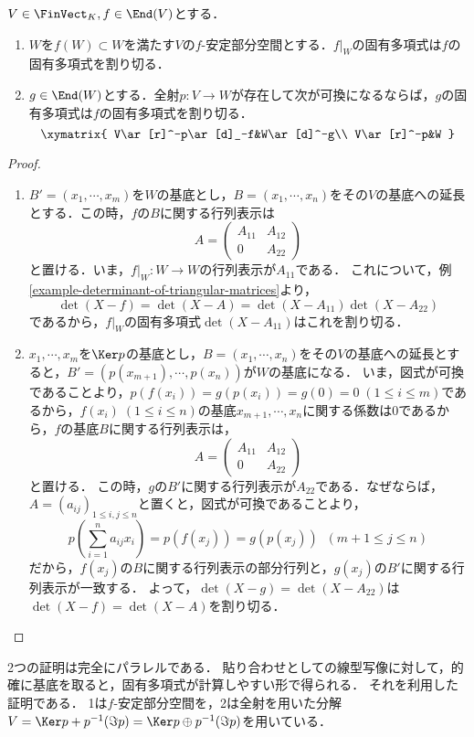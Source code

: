 \documentclass[uplatex, dvipdfmx]{jsreport}
\begin{document}
\begin{proposition}[最小公倍式としての固有多項式]\label{prop-eigenpolynomial-as-patching}
    $V\in\FinVect_K,f\in\End(V)$とする．
    \begin{enumerate}
        \item $W$を$f(W)\subset W$を満たす$V$の$f$-安定部分空間とする．$f|_W$の固有多項式は$f$の固有多項式を割り切る．
        \item $g\in\End(W)$とする．全射$p:V\to W$が存在して次が可換になるならば，$g$の固有多項式は$f$の固有多項式を割り切る．
        \[\xymatrix{
            V\ar[r]^-p\ar[d]_-f&W\ar[d]^-g\\
            V\ar[r]^-p&W
        }\]
    \end{enumerate}
\end{proposition}
\begin{proof}\mbox{}
    \begin{enumerate}
        \item $B'=(x_1,\cdots,x_m)$を$W$の基底とし，$B=(x_1,\cdots,x_n)$をその$V$の基底への延長とする．この時，$f$の$B$に関する行列表示は\[A=\begin{pmatrix}A_{11}&A_{12}\\0&A_{22}\end{pmatrix}\]と置ける．いま，$f|_W:W\to W$の行列表示が$A_{11}$である．
        これについて，例\ref{example-determinant-of-triangular-matrices}より，
        \[\det(X-f)=\det(X-A)=\det(X-A_{11})\det(X-A_{22})\]
        であるから，$f|_W$の固有多項式$\det(X-A_{11})$はこれを割り切る．
        \item $x_1,\cdots,x_m$を$\Ker p$の基底とし，$B=(x_1,\cdots,x_n)$をその$V$の基底への延長とすると，$B'=(p(x_{m+1}),\cdots,p(x_n))$が$W$の基底になる．
        いま，図式が可換であることより，$p(f(x_i))=g(p(x_i))=g(0)=0\;(1\le i\le m)$であるから，$f(x_i)\;(1\le i\le n)$の基底$x_{m+1},\cdots,x_n$に関する係数は$0$であるから，$f$の基底$B$に関する行列表示は，
        \[A=\begin{pmatrix}A_{11}&A_{12}\\0&A_{22}\end{pmatrix}\]と置ける．
        この時，$g$の$B'$に関する行列表示が$A_{22}$である．なぜならば，$A=(a_{ij})_{1\le i,j\le n}$と置くと，図式が可換であることより，
        \[p(\sum^n_{i=1}a_{ij}x_i)=p(f(x_j))=g(p(x_j))\;\;(m+1\le j\le n)\]
        だから，$f(x_j)$の$B$に関する行列表示の部分行列と，$g(x_j)$の$B'$に関する行列表示が一致する．
        よって，$\det(X-g)=\det(X-A_{22})$は$\det(X-f)=\det(X-A)$を割り切る．
    \end{enumerate}
\end{proof}
\begin{remark}
    2つの証明は完全にパラレルである．
    貼り合わせとしての線型写像に対して，的確に基底を取ると，固有多項式が計算しやすい形で得られる．
    それを利用した証明である．
    1は$f$-安定部分空間を，2は全射を用いた分解$V=\Ker p+p^{-1}(\Im p)=\Ker p\oplus p^{-1}(\Im p)$を用いている．
\end{remark}
\end{document}
